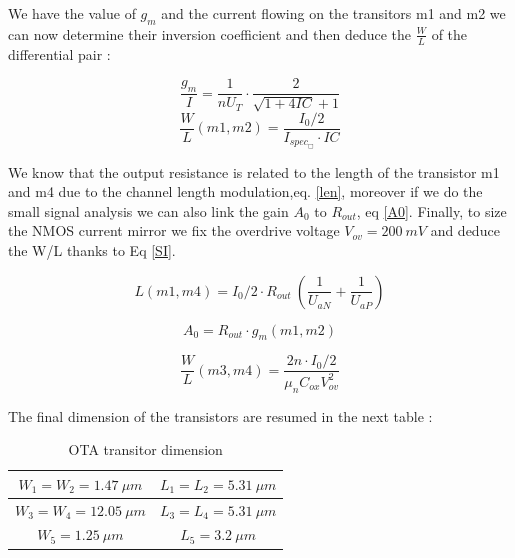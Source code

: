 \documentclass[11pt,a4paper]{report}
\begin{document}
We have the value of $g_m$ and the current flowing on the transitors m1 and m2 we can now determine their inversion coefficient and then deduce the $\frac{W}{L}$ of the differential pair :

\begin{equation}
  \frac{g_m}{I} = \frac{1}{n U_T} \cdot \frac{2}{ \sqrt{1+4IC} +1 }
\end{equation}
\begin{equation}
  \frac{W}{L}(m1,m2) = \frac{I_0/2}{I_{spec_{\Box}}\cdot IC}
\end{equation}

We know that the output resistance is related to the length of the transistor m1 and m4 due to the channel length modulation,eq. \ref{len}, moreover if we do the small signal analysis we can also link the gain $A_0$ to $R_{out}$, eq \ref{A0}. Finally, to size the NMOS current mirror we fix the overdrive voltage $V_{ov} = 200~mV$ and deduce the W/L thanks to Eq \ref{SI}. 


\begin{equation}
  L(m1,m4) = I_0/2 \cdot R_{out}~\left(\frac{1}{U_{aN}}+\frac{1}{U_{aP}}\right)
  \label{len}
\end{equation}

\begin{equation}
  A_0 = R_{out}\cdot g_m(m1,m2) 
  \label{A0}
\end{equation}

\begin{equation}
  \frac{W}{L}(m3, m4) = \frac{ 2n \cdot I_0/2}{\mu_n C_{ox} V_{ov}^2}
  \label{SI}
\end{equation}

\newpage

The final dimension of the transistors are resumed in the next table :

\begin{table}[h]
  \begin{center}
  \begin{tabular}{|c|c|}\hline
    $W_1 = W_2 = 1.47 ~\mu m$ & $L_1 = L_2 = 5.31 ~\mu m$  \\ \hline
    $W_3 = W_4 = 12.05 ~\mu m$ & $L_3 = L_4 = 5.31 ~\mu m$ \\ \hline
    $W_5 = 1.25 ~ \mu m$       & $L_5 = 3.2~\mu m$ \\ \hline
  \end{tabular}
\end{center}
\caption{OTA transitor dimension}
\end{table}
\end{document}
